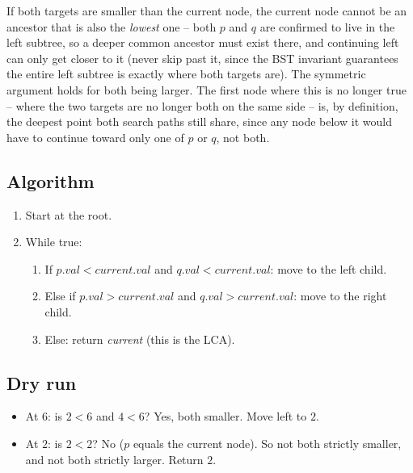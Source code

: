 If both targets are smaller than the current node, the current node
cannot be an ancestor that is also the \emph{lowest} one -- both $p$ and
$q$ are confirmed to live in the left subtree, so a deeper common
ancestor must exist there, and continuing left can only get closer to it
(never skip past it, since the BST invariant guarantees the entire left
subtree is exactly where both targets are). The symmetric argument holds
for both being larger. The first node where this is no longer true --
where the two targets are no longer both on the same side -- is, by
definition, the deepest point both search paths still share, since any
node below it would have to continue toward only one of $p$ or $q$, not
both.

\subsection*{Algorithm}

\begin{enumerate}
  \item Start at the root.
  \item While true:
  \begin{enumerate}
    \item If $p.\textit{val} < \textit{current}.\textit{val}$ and
          $q.\textit{val} < \textit{current}.\textit{val}$: move to the
          left child.
    \item Else if $p.\textit{val} > \textit{current}.\textit{val}$ and
          $q.\textit{val} > \textit{current}.\textit{val}$: move to the
          right child.
    \item Else: return \textit{current} (this is the LCA).
  \end{enumerate}
\end{enumerate}

\subsection*{Dry run}


\begin{itemize}
  \item At $6$: is $2<6$ and $4<6$? Yes, both smaller. Move left to
        $2$.
  \item At $2$: is $2<2$? No ($p$ equals the current node). So not both
        strictly smaller, and not both strictly larger. Return $2$.
\end{itemize}

